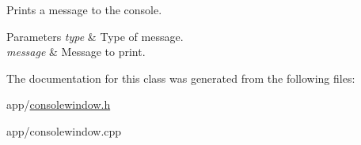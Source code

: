 Prints a message to the console. 


\begin{DoxyParams}{Parameters}
{\em type} & Type of message. \\
\hline
{\em message} & Message to print. \\
\hline
\end{DoxyParams}


The documentation for this class was generated from the following files\-:\begin{DoxyCompactItemize}
\item 
app/\hyperlink{consolewindow_8h}{consolewindow.\-h}\item 
app/consolewindow.\-cpp\end{DoxyCompactItemize}
